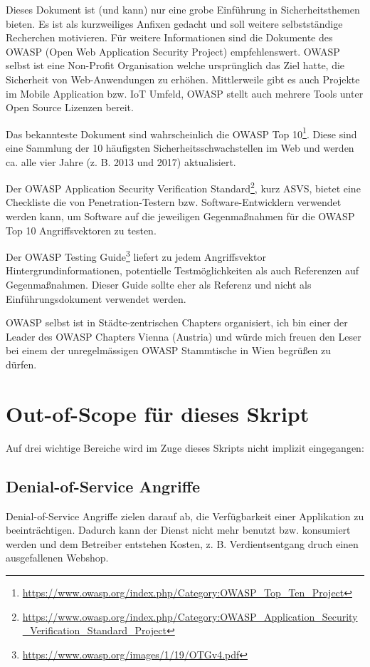 Dieses Dokument ist (und kann) nur eine grobe Einführung in Sicherheitsthemen bieten. Es ist als kurzweiliges Anfixen gedacht und soll weitere selbstständige Recherchen motivieren. Für weitere Informationen sind die Dokumente des OWASP (Open Web Application Security Project) empfehlenswert. OWASP selbst ist eine Non-Profit Organisation welche ursprünglich das Ziel hatte, die Sicherheit von Web-Anwendungen zu erhöhen. Mittlerweile gibt es auch Projekte im Mobile Application bzw. IoT Umfeld, OWASP stellt auch mehrere Tools unter Open Source Lizenzen bereit.

Das bekannteste Dokument sind wahrscheinlich die OWASP Top 10\footnote{\url{https://www.owasp.org/index.php/Category:OWASP_Top_Ten_Project}}. Diese sind eine Sammlung der 10 häufigsten Sicherheitsschwachstellen im Web und werden ca. alle vier Jahre (z. B. 2013 und 2017) aktualisiert.

Der OWASP Application Security Verification Standard\footnote{\url{https://www.owasp.org/index.php/Category:OWASP_Application_Security_Verification_Standard_Project}}, kurz ASVS, bietet eine Checkliste die von Penetration-Testern bzw. Software-Entwicklern verwendet werden kann, um Software auf die jeweiligen Gegenmaßnahmen für die OWASP Top 10 Angriffsvektoren zu testen.

Der OWASP Testing Guide\footnote{\url{https://www.owasp.org/images/1/19/OTGv4.pdf}} liefert zu jedem Angriffsvektor Hintergrundinformationen, potentielle Testmöglichkeiten als auch Referenzen auf Gegenmaßnahmen. Dieser Guide sollte eher als Referenz und nicht als Einführungsdokument verwendet werden.

OWASP selbst ist in Städte-zentrischen Chapters organisiert, ich bin einer der Leader des OWASP Chapters Vienna (Austria) und würde mich freuen den Leser bei einem der unregelmässigen OWASP Stammtische in Wien begrüßen zu dürfen.

\section{Out-of-Scope für dieses Skript}

Auf drei wichtige Bereiche wird im Zuge dieses Skripts nicht implizit eingegangen:

\subsection{Denial-of-Service Angriffe}

Denial-of-Service Angriffe zielen darauf ab, die Verfügbarkeit einer Applikation zu beeinträchtigen. Dadurch kann der Dienst nicht mehr benutzt bzw. konsumiert werden und dem Betreiber entstehen Kosten, z. B. Verdientsentgang druch einen ausgefallenen Webshop.

